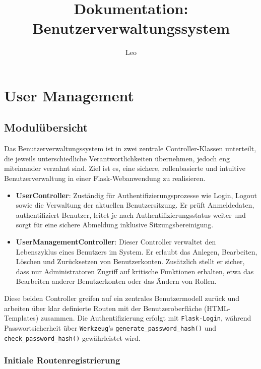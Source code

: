 \documentclass[12pt]{article}
\title{Dokumentation: Benutzerverwaltungssystem}
\author{Leo}
\date{}
\begin{document}
\maketitle

\section{User Management}

\subsection{Modulübersicht}

Das Benutzerverwaltungssystem ist in zwei zentrale Controller-Klassen unterteilt, die jeweils unterschiedliche Verantwortlichkeiten übernehmen, jedoch eng miteinander verzahnt sind. Ziel ist es, eine sichere, rollenbasierte und intuitive Benutzerverwaltung in einer Flask-Webanwendung zu realisieren.

\begin{itemize}
  \item \textbf{UserController}: Zuständig für Authentifizierungsprozesse wie Login, Logout sowie die Verwaltung der aktuellen Benutzersitzung. Er prüft Anmeldedaten, authentifiziert Benutzer, leitet je nach Authentifizierungsstatus weiter und sorgt für eine sichere Abmeldung inklusive Sitzungsbereinigung.
  
  \item \textbf{UserManagementController}: Dieser Controller verwaltet den Lebenszyklus eines Benutzers im System. Er erlaubt das Anlegen, Bearbeiten, Löschen und Zurücksetzen von Benutzerkonten. Zusätzlich stellt er sicher, dass nur Administratoren Zugriff auf kritische Funktionen erhalten, etwa das Bearbeiten anderer Benutzerkonten oder das Ändern von Rollen.
\end{itemize}

\noindent Diese beiden Controller greifen auf ein zentrales Benutzermodell zurück und arbeiten über klar definierte Routen mit der Benutzeroberfläche (HTML-Templates) zusammen. Die Authentifizierung erfolgt mit \texttt{Flask-Login}, während Passwortsicherheit über \texttt{Werkzeug}'s \texttt{generate\_password\_hash()} und \texttt{check\_password\_hash()} gewährleistet wird.

\subsubsection*{Initiale Routenregistrierung}
\end{document}
